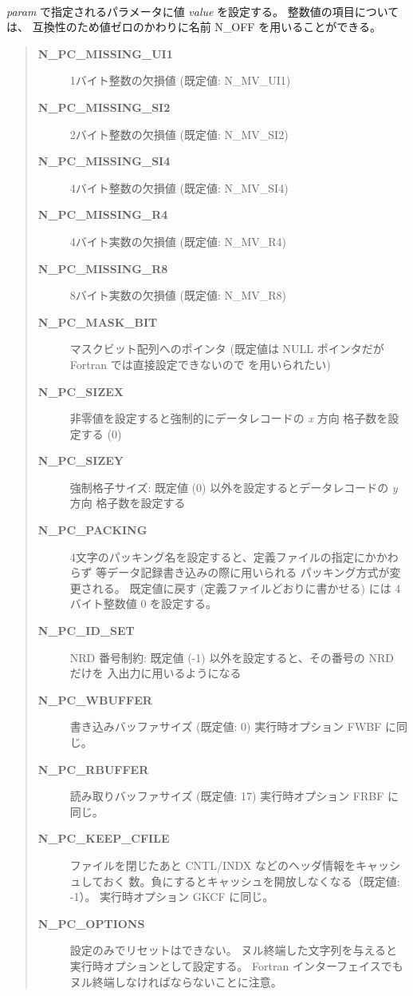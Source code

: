 \paragraph{\FuncDesc}
{\it param} で指定されるパラメータに値 {\it value} を設定する。
整数値の項目については、
互換性のため値ゼロのかわりに名前 N\_OFF を用いることができる。
\begin{quote}\begin{description}
\item[{\bf N\_PC\_MISSING\_UI1}] 1バイト整数の欠損値 (既定値: N\_MV\_UI1)
\item[{\bf N\_PC\_MISSING\_SI2}] 2バイト整数の欠損値 (既定値: N\_MV\_SI2)
\item[{\bf N\_PC\_MISSING\_SI4}] 4バイト整数の欠損値 (既定値: N\_MV\_SI4)
\item[{\bf N\_PC\_MISSING\_R4}] 4バイト実数の欠損値 (既定値: N\_MV\_R4)
\item[{\bf N\_PC\_MISSING\_R8}] 8バイト実数の欠損値 (既定値: N\_MV\_R8)
\item[{\bf N\_PC\_MASK\_BIT}] マスクビット配列へのポインタ
(既定値は NULL ポインタだが Fortran では直接設定できないので
 を用いられたい)
\item[{\bf N\_PC\_SIZEX}] 
非零値を設定すると強制的にデータレコードの {\it x} 方向
格子数を設定する (0)
\item[{\bf N\_PC\_SIZEY}] 
強制格子サイズ:
既定値 (0) 以外を設定するとデータレコードの {\it y} 方向
格子数を設定する
\item[{\bf N\_PC\_PACKING}] 
4文字のパッキング名を設定すると、定義ファイルの指定にかかわらず
 等データ記録書き込みの際に用いられる
パッキング方式が変更される。
既定値に戻す (定義ファイルどおりに書かせる) には
4 バイト整数値 0 を設定する。
\item[{\bf N\_PC\_ID\_SET}] 
NRD 番号制約:
既定値 (-1) 以外を設定すると、その番号の NRD だけを
入出力に用いるようになる
\item[{\bf N\_PC\_WBUFFER}] 
書き込みバッファサイズ (既定値: 0)
実行時オプション FWBF に同じ。
\item[{\bf N\_PC\_RBUFFER}] 
読み取りバッファサイズ (既定値: 17)
実行時オプション FRBF に同じ。
\item[{\bf N\_PC\_KEEP\_CFILE}] 
ファイルを閉じたあと CNTL/INDX などのヘッダ情報をキャッシュしておく
数。負にするとキャッシュを開放しなくなる（既定値: -1）。
実行時オプション GKCF に同じ。
\item[{\bf N\_PC\_OPTIONS}] 
設定のみでリセットはできない。
ヌル終端した文字列を与えると実行時オプションとして設定する。
Fortran インターフェイスでもヌル終端しなければならないことに注意。
\end{description}\end{quote}

